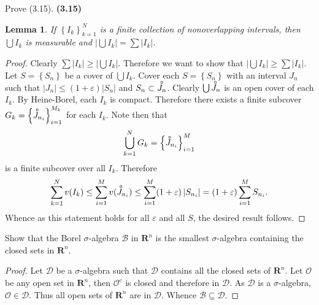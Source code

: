 \documentclass[12pt]{book}
\newcommand{\set}[1]{\left\{ #1 \right\}}
\renewcommand{\cal}[1]{\mathscr{#1}}
\newcommand{\bu}{\bigcup}
\renewcommand{\ss}{\subseteq}
\newcommand{\R}{\mathbf{R}}
\renewcommand{\.}{\mkern1mu}
\newcommand{\e}{\varepsilon}
\newcommand{\abs}[1]{\left| #1 \right|}
\newcommand{\inter}[1]{\accentset{\bf\circ}{#1}}
\theoremstyle{theorem}
\newtheorem{lemma}{Lemma}
\newcommand{\thmindent}{\setlength{\parindent}{17pt}}
\newenvironment{lem}[1]
	{\noindent \textbf{#1}\hspace{2ex}\begin{minipage}[t]{\linewidth - \widthof{\textbf{(#1)}}}\begin{lemma}\thmindent }
	{\end{lemma}\end{minipage}\medskip}
\renewcommand{\bf}[1]{\boldsymbol{#1}}
\begin{document}
\item Prove (3.15).
	\begin{lem}{(3.15)} If $\set{I_k}_{k=1}^N$ is a finite collection of nonoverlapping intervals, then $\bu I_k$ is measurable and $\abs{\bu I_k} = \sum \abs{I_k}$.
	\end{lem}
	\begin{proof}
	Clearly $\sum \abs{I_k} \geq \abs{\bu I_k}.$ Therefore we want to show that $\abs{\bu I_k} \geq \sum\abs{I_k}$.\\
	
	Let $S = \set{S_n}$ be a cover of $\bu I_k$. Cover each $S = \set{S_n}$  with an interval $J_n$ such that $\abs{J_n} \leq (1+\e)\abs{S_n}$ and $S_n \subset \inter{J_n}$. Clearly $\bu \inter{J}_n$ is an open cover of each $I_k$. By Heine-Borel, each $I_k$ is compact. Therefore there exists a finite subcover $G_k = \set{\inter{J}_{n_i}}_{i=1}^{M_k}$ for each $I_k$. Note then that 
		\[ \bu_{k=1}^N G_k = \set{\inter{J}_{n_i}}_{i=1}^M \]
	is a finite subcover over all $I_k$. Therefore
		\[ \sum_{k=1}^N v(I_k) \leq \sum_{i=1}^M v(\inter{J}_{n_i}) \leq \sum_{i=1}^M(1+\e)\abs{S_{n_i}} = (1+\e)\sum_{i=1}^M S_{n_i}. \]
	Whence as this statement holds for all $\e$ and all $S$, the desired result follows.			
	\end{proof}
\item Show that the Borel $\sigma$-algebra $\cal{B}$ in $\R^n$ is the smallest $\sigma$-algebra containing the closed sets in $\R^n$.
	\begin{proof}
	Let $\cal{D}$ be a $\sigma$-algebra such that $\cal{D}$ contains all the closed sets of $\R^n$. Let $\cal{O}$ be any open set in $\R^n$, then $\cal{O}^c$ is closed and therefore in $\cal{D}$. As $\cal{D}$ is a $\sigma$-algebra, $\cal{O}\in\cal{D}$. Thus all open sets of $\R^n$ are in $\cal{D}$. Whence $\cal{B} \ss \cal{D}$.
	\end{proof}
\end{document}

